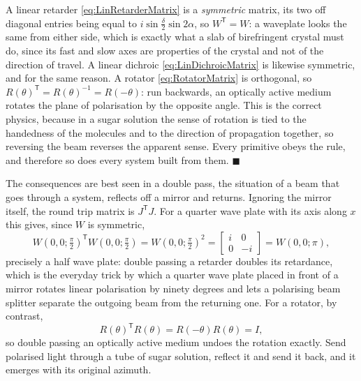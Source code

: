             A linear retarder \ref{eq:LinRetarderMatrix} is a \emph{symmetric} matrix, its two off diagonal entries being equal to $i\sin\tfrac{\delta}{2}\sin2\alpha$, so $W^{\mathsf T}=W$: a waveplate looks the same from either side, which is exactly what a slab of birefringent crystal must do, since its fast and slow axes are properties of the crystal and not of the direction of travel. A linear dichroic \ref{eq:LinDichroicMatrix} is likewise symmetric, and for the same reason. A rotator \ref{eq:RotatorMatrix} is orthogonal, so $R(\theta)^{\mathsf T}=R(\theta)^{-1}=R(-\theta)$: run backwards, an optically active medium rotates the plane of polarisation by the opposite angle. This is the correct physics, because in a sugar solution the sense of rotation is tied to the handedness of the molecules and to the direction of propagation together, so reversing the beam reverses the apparent sense. Every primitive obeys the rule, and therefore so does every system built from them. $\blacksquare$

            The consequences are best seen in a double pass, the situation of a beam that goes through a system, reflects off a mirror and returns. Ignoring the mirror itself, the round trip matrix is $J^{\mathsf T}J$. For a quarter wave plate with its axis along $x$ this gives, since $W$ is symmetric,
            \begin{equation}\label{eq:DoublePassQWP}
                W\left(0,0;\tfrac{\pi}{2}\right)^{\mathsf T}W\left(0,0;\tfrac{\pi}{2}\right) = W\left(0,0;\tfrac{\pi}{2}\right)^2 = \begin{bmatrix}i&0\\0&-i\end{bmatrix} = W\left(0,0;\pi\right) ,
            \end{equation}
            precisely a half wave plate: double passing a retarder doubles its retardance, which is the everyday trick by which a quarter wave plate placed in front of a mirror rotates linear polarisation by ninety degrees and lets a polarising beam splitter separate the outgoing beam from the returning one. For a rotator, by contrast,
            \begin{equation}\label{eq:DoublePassRotator}
                R(\theta)^{\mathsf T}R(\theta) = R(-\theta)R(\theta) = I ,
            \end{equation}
            so double passing an optically active medium undoes the rotation exactly. Send polarised light through a tube of sugar solution, reflect it and send it back, and it emerges with its original azimuth.

